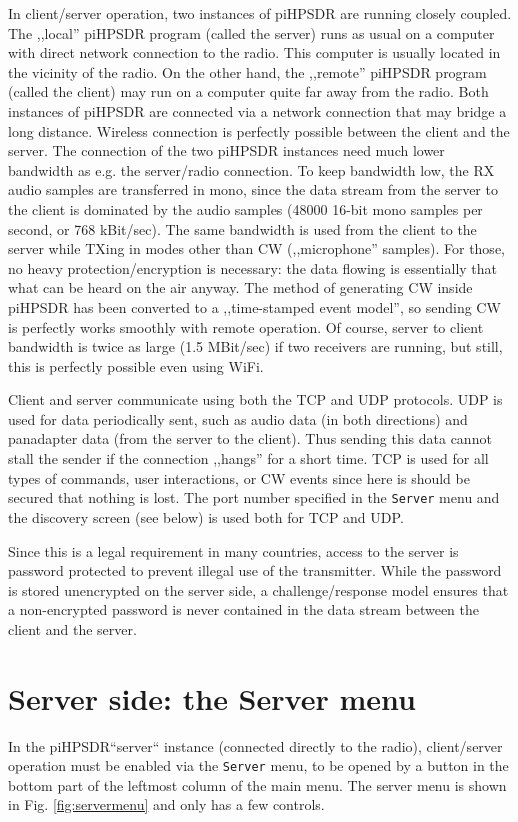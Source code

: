\documentclass[12pt]{book}
\def\bltt#1{\texttt{\color{blue}#1}}
\def\pH{pi\-HPSDR\xspace}
\begin{document}
In client/server operation, two instances of \pH are running closely coupled. The ,,local'' \pH program
(called the server) runs as usual on a computer with direct network connection to the radio. This computer is usually located
in the vicinity of the radio. On the other hand, the ,,remote'' \pH program (called the client) may run
on a computer quite far away from the radio. Both instances of \pH are connected via a network connection
that may bridge a long distance. Wireless connection is perfectly possible between the client and the server.
The connection of the two \pH instances need much lower bandwidth as e.g. the server/radio connection.
To keep bandwidth low, the RX audio samples are transferred in mono, since
the data stream from the server to the client is dominated by the audio samples (48000 16-bit
mono samples per second, or  768 kBit/sec). The same bandwidth is used from the client to the server
while TXing in modes other than CW (,,microphone'' samples). For those,
no heavy protection/encryption is necessary: the data flowing is
essentially that what can be heard on the air anyway. The method of generating CW inside \pH has been
converted to a ,,time-stamped event model'', so sending CW is perfectly works smoothly with remote operation.
Of course, server to client bandwidth is twice as large (1.5 MBit/sec) if two receivers are running, but still,
this is perfectly possible even using WiFi.

Client and server communicate using both the TCP and UDP protocols. UDP is used for data periodically sent,
such as audio data (in both directions) and panadapter data (from the server to the client). Thus sending
this data cannot stall the sender if the connection ,,hangs'' for a short time. TCP is used for all types
of commands, user interactions, or CW events since here is should be secured that nothing is lost. The
port number specified in the \bltt{Server} menu and the discovery screen (see below)
is used both for TCP and UDP.

Since this is a legal requirement in many countries, access to the server is password protected to prevent
illegal use of the transmitter. While the password is stored unencrypted on the server side, a challenge/response
model ensures that a non-encrypted password is never contained in the data stream between the client and
the server.

\section{Server side: the Server menu}
In the \pH ``server`` instance (connected directly to the radio), client/server operation must be enabled
via the \bltt{Server} menu, to be opened by a button in the bottom  part of the leftmost  column of the  main menu.
The server menu is shown in Fig. \ref{fig:servermenu} and only has a few controls.
\end{document}
